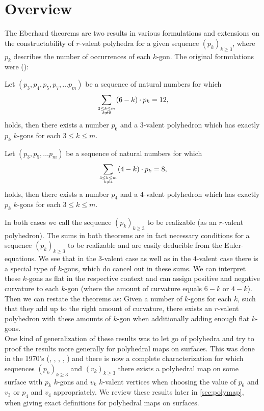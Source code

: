 \section{Overview}

The {\sc Eberhard} theorems are two results in various formulations and extensions on the constructability of $r$-valent polyhedra for a given sequence $(p_k)_{k \geq 3}$, where $p_k$ describes the number of occurrences of each $k$-gon. The original formulations were (\cite{ConvexPolytopes}):
\begin{theorem}\label{thm:eberhard:3} Let $(p_3, p_4, p_5, p_7, \dots p_m)$ be a sequence of natural numbers for which
\begin{align*}
  \sum_{3 \leq k \leq m \atop k \neq 6}(6 - k) \cdot p_k = 12,
\end{align*}
holds, then there exists a number $p_6$ and a $3$-valent polyhedron which has exactly $p_k$ $k$-gons for each $3 \leq k \leq m$.
\end{theorem}
\begin{theorem}\label{thm:eberhard:4} Let $(p_3,  p_5, \dots p_m)$ be a sequence of natural numbers for which
\begin{align*}
  \sum_{3 \leq k \leq m \atop k \neq 4}(4 - k) \cdot p_k = 8,
\end{align*}
holds, then there exists a number $p_4$ and a $4$-valent polyhedron which has exactly $p_k$ $k$-gons for each $3 \leq k \leq m$.
\end{theorem}
In both cases we call the sequence $(p_k)_{k \geq 3}$ to be realizable (as an $r$-valent polyhedron). The sums in both theorems are in fact necessary conditions for a sequence $(p_k)_{k \geq 3}$ to be realizable and are easily deducible from the {\sc Euler}-equations. We see that in the $3$-valent case as well as in the $4$-valent case there is a special type of $k$-gons, which do cancel out in these sums. We can interpret these $k$-gons as flat in the respective context and can assign positive and negative curvature to each $k$-gon (where the amount of curvature equals $6 - k$ or $4 - k$). Then we can restate the theorems as: Given a number of $k$-gons for each $k$, such that they add up to the right amount of curvature, there exists an $r$-valent polyhedron with these amounts of $k$-gon when additionally adding enough flat $k$-gons.\\

One kind of generalization of these results was to let go of polyhedra and try to proof the results more generally for polyhedral maps on surfaces. This was done in the 1970's (\cite{jendrol1977generalization}, \cite{jucovivc1973theorem}, \cite{barnette1971toroidal}, \cite{grunbaum1969planar}, \cite{zaks1971analogue}) and there is now a complete characterization for which sequences $(p_k)_{k\geq 3}$ and $(v_k)_{k \geq 3}$ there exists a polyhedral map on some surface with $p_k$ $k$-gons and $v_k$ $k$-valent vertices when choosing the value of $p_6$ and $v_3$ or $p_4$ and $v_4$ appropriately. We review these results later in \autoref{sec:polymap}, when giving exact definitions for polyhedral maps on surfaces.\\

